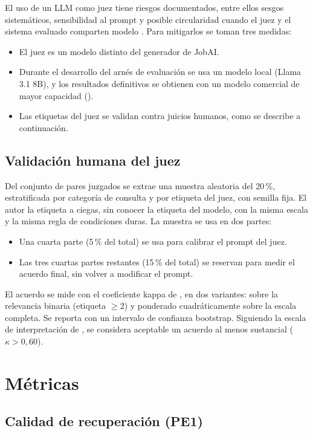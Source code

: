 El uso de un LLM como juez tiene riesgos documentados, entre ellos sesgos sistemáticos, sensibilidad al prompt y posible circularidad cuando el juez y el sistema evaluado comparten modelo \citep{Faggioli2023,Zheng2023}. Para mitigarlos se toman tres medidas:
\begin{itemize}
    \item El juez es un modelo distinto del generador de JobAI.
    \item Durante el desarrollo del arnés de evaluación se usa un modelo local (Llama 3.1 8B), y los resultados definitivos se obtienen con un modelo comercial de mayor capacidad ().
    \item Las etiquetas del juez se validan contra juicios humanos, como se describe a continuación.
\end{itemize}

\subsection{Validación humana del juez}

Del conjunto de pares juzgados se extrae una muestra aleatoria del 20\,\%, estratificada por categoría de consulta y por etiqueta del juez, con semilla fija. El autor la etiqueta a ciegas, sin conocer la etiqueta del modelo, con la misma escala y la misma regla de condiciones duras. La muestra se usa en dos partes:
\begin{itemize}
    \item Una cuarta parte (5\,\% del total) se usa para calibrar el prompt del juez.
    \item Las tres cuartas partes restantes (15\,\% del total) se reservan para medir el acuerdo final, sin volver a modificar el prompt.
\end{itemize}

El acuerdo se mide con el coeficiente kappa de \citet{Cohen1960}, en dos variantes: sobre la relevancia binaria (etiqueta $\geq 2$) y ponderado cuadráticamente sobre la escala completa. Se reporta con un intervalo de confianza bootstrap. Siguiendo la escala de interpretación de \citet{Landis1977}, se considera aceptable un acuerdo al menos sustancial ($\kappa > 0{,}60$).

\section{Métricas}
\label{sec:met-metricas}

\subsection{Calidad de recuperación (PE1)}

